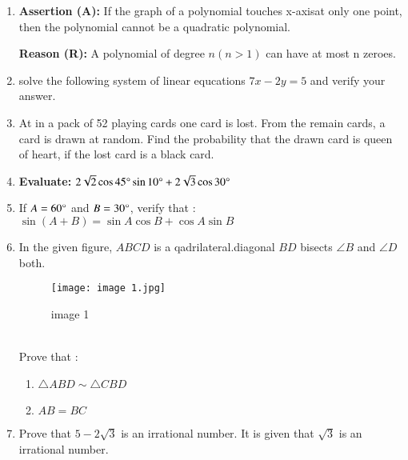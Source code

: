\documentclass[12pt,-letter paper]{article}
\providecommand{\brak}[1]{\ensuremath{\left(#1\right)}}
\begin{document}
\begin{enumerate}
\item \textbf{Assertion (A):} If the graph of a polynomial touches x-axisat only one point, then the polynomial cannot be a quadratic polynomial.

	\textbf{Reason (R):} A polynomial of degree $n\brak{n > 1}$ can have at most n zeroes.
\item solve the following system of linear equcations $7x-2y=5$ and verify your answer.
\item At in a pack of 52 playing cards one card is lost. From the remain cards, a card is drawn at random.
Find the probability that the drawn card is queen of heart, if the lost card is a black card.
\item\textbf{ Evaluate:} $2\sqrt{2} \cos 45\degree \sin 10\degree + 2\sqrt{3} \cos 30\degree$

\item If  $A = 60\degree$ and  $B = 30\degree$, verify that : $\sin\brak{A + B} = \sin A \cos B + \cos A \sin B$

\item In  the given figure, $ABCD$ is a qadrilateral.diagonal $BD$ bisects $\angle B$ and $\angle D$ both. 
\begin{figure}[!ht]
\centering
\texttt{[image: image 1.jpg]}
\label{fig:image 1}
\caption{image 1}
\end{figure}\\
\text Prove that :	
\begin{enumerate}	
\item$\triangle ABD \sim \triangle CBD $\
\item $AB = BC$
\end{enumerate}
\newpage
\item Prove that $ 5 - 2\sqrt{3}$ is an irrational number. It is given that $\sqrt{3}$  is an irrational number.


\end{enumerate}
\end{document}
